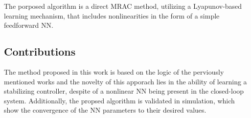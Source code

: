 The porposed algorithm is a direct MRAC method, utilizing a Lyapunov-based learning mechanism, that includes nonlinearities in the form of a simple feedforward NN.





\subsection{Contributions}
\label{sec:contributions}
The method proposed in this work is based on the logic of the perviously mentioned works and the novelty of this apporach lies in the ability of learning a stabilizing controller, despite of a nonlinear NN being present in the closed-loop system. Additionally, the propsed algorithm is validated in simulation, which show the convergence of the NN parameters to their desired values.